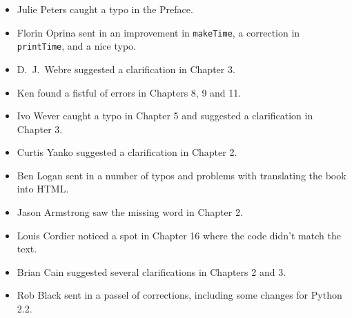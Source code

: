 \documentclass[10pt]{book}
\begin{document}
\begin{itemize}

\item Julie Peters caught a typo in the Preface.

\item Florin Oprina sent in an improvement in {\tt makeTime},
a correction in {\tt printTime}, and a nice typo.

\item D.~J.~Webre suggested a clarification in Chapter 3.


\item Ken found a fistful of errors in Chapters 8, 9 and 11.

\item Ivo Wever caught a typo in Chapter 5 and suggested a clarification
in Chapter 3.


\item Curtis Yanko suggested a clarification in Chapter 2.

\item Ben Logan sent in a number of typos and problems with translating
the book into HTML.



\item Jason Armstrong saw the missing word in Chapter 2.

\item Louis Cordier noticed a spot in Chapter 16 where the code
didn't match the text.

\item Brian Cain suggested several clarifications in Chapters 2 and 3.

\item Rob Black sent in a passel of corrections, including some
changes for Python 2.2.


\end{itemize}
\end{document}
